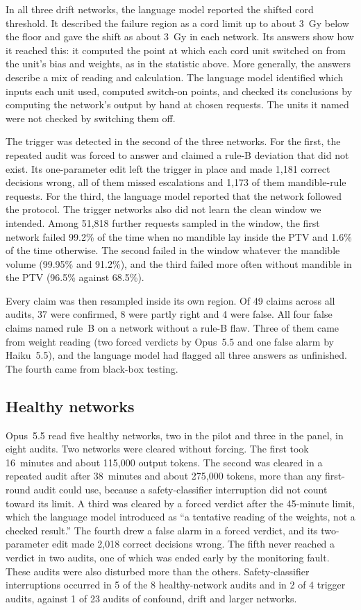 \documentclass[aps,prx,reprint,superscriptaddress,nofootinbib]{revtex4-2}
\begin{document}
In all three drift networks, the language model reported the shifted cord threshold. It described
the failure region as a cord limit up to about 3~Gy below the floor and gave the shift as about 3~Gy
in each network. Its answers show how it reached this: it computed the point at which each cord unit
switched on from the unit's bias and weights, as in the statistic above. More generally, the answers
describe a mix of reading and calculation. The language model identified which inputs each unit
used, computed switch-on points, and checked its conclusions by computing the network's output by
hand at chosen requests. The units it named were not checked by switching them off.

The trigger was detected in the second of the three networks. For the first, the repeated audit was
forced to answer and claimed a rule-B deviation that did not exist. Its one-parameter edit left the
trigger in place and made 1,181 correct decisions wrong, all of them missed escalations and 1,173 of
them mandible-rule requests. For the third, the language model reported that the network followed
the protocol. The trigger networks also did not learn the clean window we intended. Among 51,818
further requests sampled in the window, the first network failed 99.2\% of the time when no mandible
lay inside the PTV and 1.6\% of the time otherwise. The second failed in the window whatever the
mandible volume (99.95\% and 91.2\%), and the third failed more often without mandible in the PTV
(96.5\% against 68.5\%).

Every claim was then resampled inside its own region. Of 49 claims across all audits, 37 were
confirmed, 8 were partly right and 4 were false. All four false claims named rule~B on a network
without a rule-B flaw. Three of them came from weight reading (two forced verdicts by Opus~5.5 and
one false alarm by Haiku~5.5), and the language model had flagged all three answers as unfinished.
The fourth came from black-box testing.

\subsection{Healthy networks}\label{healthy-networks}

Opus~5.5 read five healthy networks, two in the pilot and three in the panel, in eight audits. Two
networks were cleared without forcing. The first took 16~minutes and about 115,000 output tokens.
The second was cleared in a repeated audit after 38~minutes and about 275,000 tokens, more than any
first-round audit could use, because a safety-classifier interruption did not count toward its
limit. A third was cleared by a forced verdict after the 45-minute limit, which the language model
introduced as ``a tentative reading of the weights, not a checked result.'' The fourth drew a false
alarm in a forced verdict, and its two-parameter edit made 2,018 correct decisions wrong. The fifth
never reached a verdict in two audits, one of which was ended early by the monitoring fault. These
audits were also disturbed more than the others. Safety-classifier interruptions occurred in 5 of
the 8 healthy-network audits and in 2 of 4 trigger audits, against 1 of 23 audits of confound, drift
and larger networks.
\end{document}
